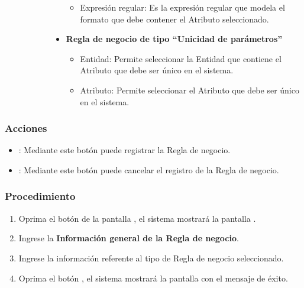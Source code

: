 \begin{description}
\begin{description}
\begin{itemize}
\begin{itemize}
			\item Expresión regular: Es la expresión regular que modela el formato que debe contener el Atributo seleccionado.
		  \end{itemize}
		  \item \textbf{Regla de negocio de tipo ``Unicidad de parámetros''}
		  \begin{itemize}
			\item Entidad: Permite seleccionar la Entidad que contiene el Atributo que debe ser único en el sistema.
			\item Atributo: Permite seleccionar el Atributo que debe ser único en el sistema.
		  \end{itemize}
	    \end{itemize}
	 \end{description}
\end{description}

\subsubsection{Acciones}
\begin{itemize}
 \item {}: Mediante este botón puede registrar la Regla de negocio.
 \item {}: Mediante este botón puede cancelar el registro de la Regla de negocio.
\end{itemize}
	
	
\subsubsection{Procedimiento}
\begin{enumerate}
	\item Oprima el botón  de la pantalla , el sistema mostrará la pantalla . 

	
	\item Ingrese la \textbf{Información general de la Regla de negocio}.
	
	\item Ingrese la información referente al tipo de Regla de negocio seleccionado.
	
	\item Oprima el botón , el sistema mostrará la pantalla  con el mensaje de éxito.
\end{enumerate}


